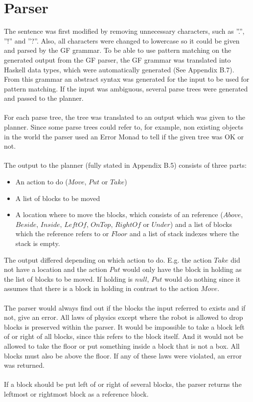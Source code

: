 \section{Parser}
The sentence was first modified by removing unnecessary characters, such as
''.'', ''!'' and ''?''. Also, all characters were changed to lowercase so it
could be given and parsed by the GF grammar. To be able to use pattern matching
on the generated output from the GF parser, the GF grammar was translated into
Haskell data types, which were automatically generated (See Appendix B.7). From
this grammar an abstract syntax was generated for the input to be used for
pattern matching. If the input was ambiguous, several parse trees were
generated and passed to the planner. \\\\
For each parse tree, the tree was translated to an output which was given to
the planner. Since some parse trees could refer to, for example, non existing
objects in the world the parser used an Error Monad to tell if the given tree
was OK or not. \\\\
The output to the planner (fully stated in Appendix B.5) consists of three parts:
\begin{itemize}
\item An action to do ($Move$, $Put$ or $Take$)
\item A list of blocks to be moved
\item A location where to move the blocks, which consists of an reference
        ($Above$, $Beside$, $Inside$, $LeftOf$, $OnTop$, $RightOf$ or $Under$)
        and a list of blocks which the reference refers to or $Floor$ and a
        list of stack indexes where the stack is empty.
\end{itemize}
The output differed depending on which action to do. E.g. the action $Take$ did
not have a location and the action $Put$ would only have the block in holding
as the list of blocks to be moved. If holding is $null$, $Put$ would do nothing
since it assumes that there is a block in holding in contrast to the action
$Move$.\\\\
The parser would always find out if the blocks the input referred to exists and
if not, give an error. All laws of physics except where the robot is allowed to
drop blocks is preserved within the parser. It would be impossible to take a
block left of or right of all blocks, since this refers to the block itself.
And it would not be allowed to take the floor or put something inside a block
that is not a box. All blocks must also be above the floor. If any of these
laws were violated, an error was returned.
 \\\\
If a block should be put left of or right of several blocks, the parser returns
the leftmost or rightmost block as a reference block. 

